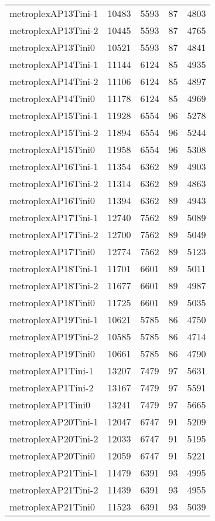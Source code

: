 \begin{longtable}{lrrrr}
metroplexAP13Tini-1 & 10483 & 5593 & 87 & 4803 \\
metroplexAP13Tini-2 & 10445 & 5593 & 87 & 4765 \\
metroplexAP13Tini0 & 10521 & 5593 & 87 & 4841 \\
metroplexAP14Tini-1 & 11144 & 6124 & 85 & 4935 \\
metroplexAP14Tini-2 & 11106 & 6124 & 85 & 4897 \\
metroplexAP14Tini0 & 11178 & 6124 & 85 & 4969 \\
metroplexAP15Tini-1 & 11928 & 6554 & 96 & 5278 \\
metroplexAP15Tini-2 & 11894 & 6554 & 96 & 5244 \\
metroplexAP15Tini0 & 11958 & 6554 & 96 & 5308 \\
metroplexAP16Tini-1 & 11354 & 6362 & 89 & 4903 \\
metroplexAP16Tini-2 & 11314 & 6362 & 89 & 4863 \\
metroplexAP16Tini0 & 11394 & 6362 & 89 & 4943 \\
metroplexAP17Tini-1 & 12740 & 7562 & 89 & 5089 \\
metroplexAP17Tini-2 & 12700 & 7562 & 89 & 5049 \\
metroplexAP17Tini0 & 12774 & 7562 & 89 & 5123 \\
metroplexAP18Tini-1 & 11701 & 6601 & 89 & 5011 \\
metroplexAP18Tini-2 & 11677 & 6601 & 89 & 4987 \\
metroplexAP18Tini0 & 11725 & 6601 & 89 & 5035 \\
metroplexAP19Tini-1 & 10621 & 5785 & 86 & 4750 \\
metroplexAP19Tini-2 & 10585 & 5785 & 86 & 4714 \\
metroplexAP19Tini0 & 10661 & 5785 & 86 & 4790 \\
metroplexAP1Tini-1 & 13207 & 7479 & 97 & 5631 \\
metroplexAP1Tini-2 & 13167 & 7479 & 97 & 5591 \\
metroplexAP1Tini0 & 13241 & 7479 & 97 & 5665 \\
metroplexAP20Tini-1 & 12047 & 6747 & 91 & 5209 \\
metroplexAP20Tini-2 & 12033 & 6747 & 91 & 5195 \\
metroplexAP20Tini0 & 12059 & 6747 & 91 & 5221 \\
metroplexAP21Tini-1 & 11479 & 6391 & 93 & 4995 \\
metroplexAP21Tini-2 & 11439 & 6391 & 93 & 4955 \\
metroplexAP21Tini0 & 11523 & 6391 & 93 & 5039 \\

\end{longtable}
